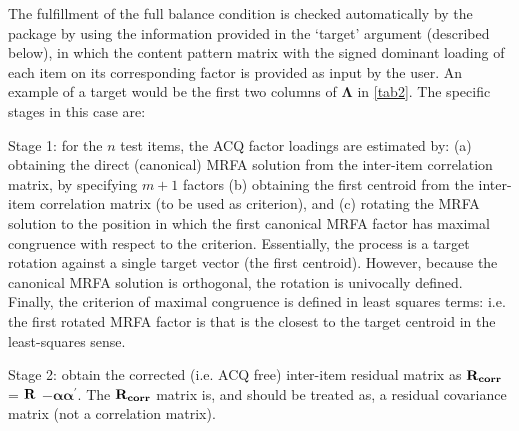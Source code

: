 The fulfillment of the full balance condition is checked automatically by the  package by using the information provided in the ‘target’ argument (described below), in which the content pattern matrix with the signed dominant loading of each item on its corresponding factor is provided as input by the user. An example of a target would be the first two columns of $\boldsymbol{\Lambda}$ in \cref{tab2}.
The specific stages in this case are:

Stage 1: for the $n$ test items, the ACQ factor loadings are estimated by: (a) obtaining the direct (canonical) MRFA solution from the inter-item correlation matrix, by specifying $m+1$ factors (b) obtaining the first centroid from the inter-item correlation matrix (to be used as criterion), and (c) rotating the MRFA solution to the position in which the first canonical MRFA factor has maximal congruence with respect to the criterion. Essentially, the process is a target rotation against a single target vector (the first centroid). However, because the canonical MRFA solution is orthogonal, the rotation is univocally defined. Finally, the criterion of maximal congruence is defined in least squares terms: i.e. the first rotated MRFA factor is that is the closest to the target centroid in the least-squares sense.

Stage 2: obtain the corrected (i.e. ACQ free) inter-item residual matrix as $\bf{R_{corr}}$ = $\bf{R}$ $ - \boldsymbol{\alpha}$$\boldsymbol{\alpha}^{'}$. The $\bf{R_{corr}}$ matrix is, and should be treated as, a residual covariance matrix (not a correlation matrix).

